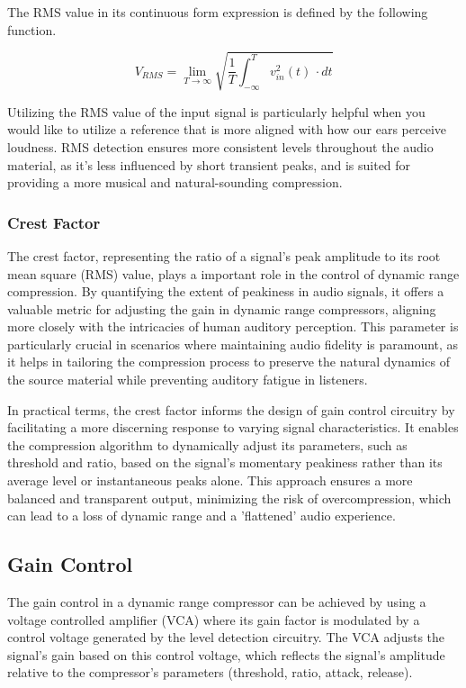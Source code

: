 \documentclass[10pt]{article}
\begin{document}
\begin{multicols}{2}
                    The RMS value in its continuous form expression is defined by the following function. \cite{aes-that-rms}
                    
                    \begin{equation}
                        V_{RMS} = \lim_{T \to \infty}\sqrt{\frac{1}{T}\int_{-\infty}^{T} v_{in}^2(t) \,\cdot dt}
                    \end{equation}
                    
                    Utilizing the RMS value of the input signal is particularly helpful when you would like to utilize a reference that is more aligned with how our ears perceive loudness. RMS detection ensures more consistent levels throughout the audio material, as it's less influenced by short transient peaks, and is suited for providing a more musical and natural-sounding compression.
                    
                \subsubsection{Crest Factor}
                    The crest factor, representing the ratio of a signal's peak amplitude to its root mean square (RMS) value, plays a important role in the control of dynamic range compression. By quantifying the extent of peakiness in audio signals, it offers a valuable metric for adjusting the gain in dynamic range compressors, aligning more closely with the intricacies of human auditory perception. This parameter is particularly crucial in scenarios where maintaining audio fidelity is paramount, as it helps in tailoring the compression process to preserve the natural dynamics of the source material while preventing auditory fatigue in listeners.\par
                    In practical terms, the crest factor informs the design of gain control circuitry by facilitating a more discerning response to varying signal characteristics. It enables the compression algorithm to dynamically adjust its parameters, such as threshold and ratio, based on the signal's momentary peakiness rather than its average level or instantaneous peaks alone. This approach ensures a more balanced and transparent output, minimizing the risk of overcompression, which can lead to a loss of dynamic range and a 'flattened' audio experience.

            \subsection{Gain Control}
                The gain control in a dynamic range compressor can be achieved by using a voltage controlled amplifier (VCA) where its gain factor is modulated by a control voltage generated by the level detection circuitry. The VCA adjusts the signal's gain based on this control voltage, which reflects the signal's amplitude relative to the compressor's parameters (threshold, ratio, attack, release).
            

\end{multicols}
\end{document}
